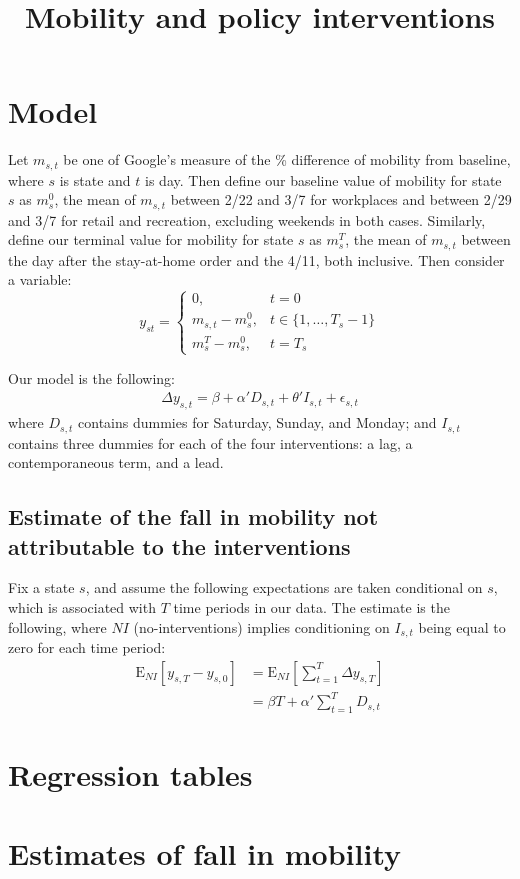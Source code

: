 \documentclass{article}
\title{Mobility and policy interventions}
\author{}
\date{}
\begin{document}
\maketitle

\section{Model}
Let $m_{s,t}$ be one of Google's measure of the \% difference of mobility from baseline, where $s$ is state and $t$ is day. Then define our baseline value of mobility for state $s$ as $m_s^0$, the mean of $m_{s,t}$ between 2/22 and 3/7 for workplaces and between 2/29 and 3/7 for retail and recreation, excluding weekends in both cases. Similarly, define our terminal value for mobility for state $s$ as
$m_s^T$, the mean of $m_{s,t}$ between the day after the stay-at-home order and the 4/11, both inclusive.
Then consider a variable:
$$
y_{st} = \begin{cases}
0, &  t = 0 \\
m_{s,t} - m_s^0, & t \in \{1, \ldots, T_s-1\} \\
m_s^T - m_s^0, & t = T_s
\end{cases}
$$

Our model is the following:
\begin{align*}
\Delta y_{s,t} = \beta + \alpha' D_{s,t} + \theta' I_{s,t} + \epsilon_{s,t}
\end{align*}
where $D_{s,t}$ contains dummies for Saturday, Sunday, and Monday; and $I_{s,t}$ contains three dummies for each of the four interventions: a lag, a contemporaneous term, and a lead.

\subsection{Estimate of the fall in mobility not attributable to the interventions}
Fix a state $s$, and assume the following expectations are taken conditional on $s$, which is associated with $T$ time periods in our data. The estimate is the following, where $NI$ (no-interventions) implies conditioning on $I_{s,t}$ being equal to zero for each time period:
\begin{align*}
\text{E}_{NI}\left[y_{s,T} - y_{s,0}\right] &=
\text{E}_{NI}\left[\sum_{t=1}^T \Delta y_{s,T}\right] \\
&= \beta T + \alpha' \sum_{t=1}^T D_{s,t}
\end{align*}

\section{Regression tables}


\section{Estimates of fall in mobility}

\end{document}
